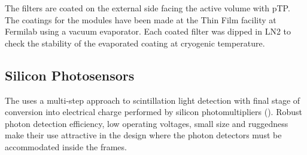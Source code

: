 The filters are coated on the external side facing the \lar active volume with pTP.  The coatings for the  modules have been made at the Thin Film facility at Fermilab using a vacuum evaporator. Each coated filter was dipped in LN2 to check the stability of the evaporated coating at cryogenic temperature. 




%




\subsection{Silicon Photosensors}
\label{sec:fdsp-pd-ps}

The   uses a multi-step approach to scintillation light detection with final stage of conversion into electrical charge performed by silicon photomultipliers (). Robust photon detection efficiency, low operating voltages, small size and ruggedness make their use attractive in the \single design where the photon detectors must be accommodated inside the  frames. 

